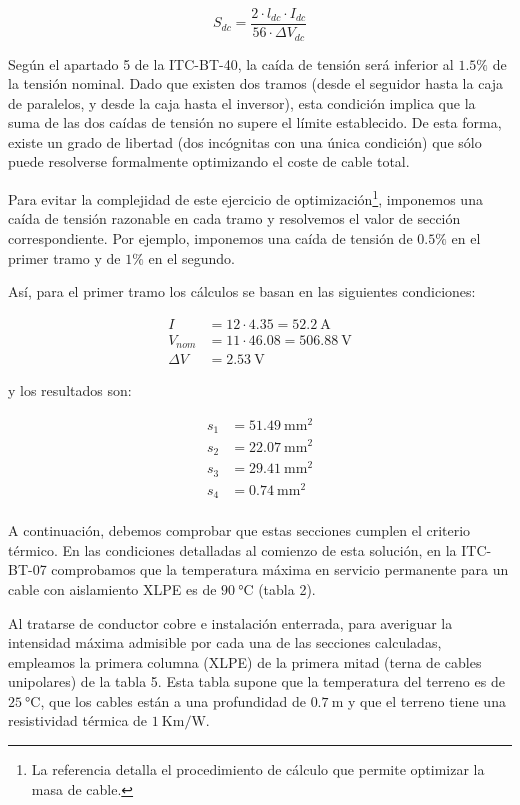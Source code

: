 \[S_{dc} =  \frac{2\cdot l_{dc}\cdot I_{dc}}{56\cdot\Delta V_{dc}}\]

Según el apartado 5 de la ITC-BT-40, la caída de tensión será inferior
al $1.5\%$ de la tensión nominal. Dado que existen dos tramos (desde el
seguidor hasta la caja de paralelos, y desde la caja hasta el
inversor), esta condición implica que la suma de las dos caídas de
tensión no supere el límite establecido. De esta forma, existe un
grado de libertad (dos incógnitas con una única condición) que sólo
puede resolverse formalmente optimizando el coste de cable total. 

Para evitar la complejidad de este ejercicio de
optimización\footnote{La referencia \citep{Perpinan2012b} detalla el
  procedimiento de cálculo que permite optimizar la masa de cable.}, imponemos una
caída de tensión razonable en cada tramo y resolvemos el valor de
sección correspondiente. Por ejemplo, imponemos una caída de tensión
de $0.5\%$ en el primer tramo y de $1\%$  en el segundo.

Así, para el primer tramo los cálculos se basan en las siguientes condiciones:

\begin{align*}
  I & = 12 \cdot 4.35 = \SI{52.2}{\ampere}\\
  V_{nom} & = 11 \cdot 46.08 = \SI{506.88}{\volt}\\
  \Delta V & = \SI{2.53}{\volt}
\end{align*}

y los resultados son:

\begin{align*}
  s_1 & = \SI{51.49}{\milli\meter\squared}\\
  s_2 & = \SI{22.07}{\milli\meter\squared}\\
  s_3 & = \SI{29.41}{\milli\meter\squared}\\
  s_4 & = \SI{0.74}{\milli\meter\squared}\\
\end{align*}

A continuación, debemos comprobar que estas secciones cumplen el
criterio térmico. En las condiciones detalladas al comienzo de esta
solución, en la ITC-BT-07 comprobamos que la temperatura máxima en
servicio permanente para un cable con aislamiento XLPE es de
$\SI{90}{\celsius}$ (tabla 2). 

Al tratarse de conductor cobre e instalación enterrada, para averiguar
la intensidad máxima admisible por cada una de las secciones
calculadas, empleamos la primera columna (XLPE) de la primera
mitad (terna de cables unipolares) de la tabla 5. Esta tabla supone
que la temperatura del terreno es de $\SI{25}{\celsius}$, que los
cables están a una profundidad de $\SI{0.7}{\meter}$ y que el terreno
tiene una resistividad térmica de $\SI{1}{\kelvin\meter\per\watt}$.

